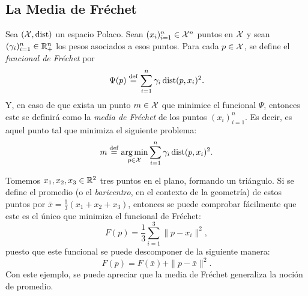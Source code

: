 {{		\subsection{La Media de Fréchet}\label{ssec:la-media-de-Frechet}
		{
			\begin{definition}
				Sea $(\mathcal{X}, \operatorname{dist})$ un espacio Polaco. Sean $(x_{i})_{i=1}^{n}\in\mathcal{X}^n$ puntos en $\mathcal{X}$ y sean $(\gamma_{i})_{i=1}^{n}\in\mathbb{R}_+^n$ los pesos asociados a esos puntos. Para cada $p\in\mathcal{X}$, se define el \emph{funcional de Fréchet} por
				\begin{equation}
					\label{eq:funcionalFrechet}
					\Psi(p) \stackrel{\mathrm{def}}{=} \sum_{i=1}^{n} \gamma_i \operatorname{dist}(p, x_i)^2.
				\end{equation}
				Y, en caso de que exista un punto $m \in \mathcal{X}$ que minimice el funcional $\Psi$, entonces este se definirá como la \emph{media de Fréchet} de los puntos $(x_{i})_{i=1}^{n}$. Es decir, es aquel punto tal que minimiza el siguiente problema:
				\begin{equation}
					\label{eq:mediaFrechet}
					m \stackrel{\mathrm{def}}{=} \operatorname*{arg\,m{i}n}_{p \in \mathcal{X}} \sum_{i=1}^{n} \gamma_i \operatorname{dist}(p, x_i)^2.
				\end{equation}
			\end{definition}

			\begin{example}\label{ex:baricentro-triangulo}
				Tomemos $x_1, x_2, x_3 \in \mathbb{R}^2$ tres puntos en el plano, formando un triángulo. Si se define el promedio (o el \textit{baricentro}, en el contexto de la geometría) de estos puntos por $\bar x = \frac{1}{3} (x_1 + x_2 + x_3)$, entonces se puede comprobar fácilmente que este es el único que minimiza el funcional de Fréchet:
				\begin{equation}
					F(p) = \frac{1}{3} \sum_{i=1}^{3} \|p - x_i\|^2,
				\end{equation}
				puesto que este funcional se puede descomponer de la siguiente manera:
				\begin{equation}
					F(p) = F(\bar x) + \|p-\bar x\|^2.
				\end{equation}
				Con este ejemplo, se puede apreciar que la media de Fréchet generaliza la noción de promedio.
			\end{example}

}}}
